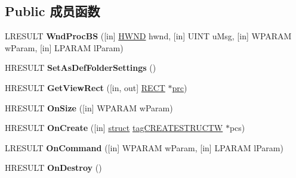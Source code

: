 \subsection*{Public 成员函数}
\begin{DoxyCompactItemize}
\item 
\mbox{\label{interface_i_browser_service2_a2fdc0084f4085173ca7bad99a1806fd5}} 
L\+R\+E\+S\+U\+LT {\bfseries Wnd\+Proc\+BS} (\mbox{[}in\mbox{]} \hyperlink{interfacevoid}{H\+W\+ND} hwnd, \mbox{[}in\mbox{]} U\+I\+NT u\+Msg, \mbox{[}in\mbox{]} W\+P\+A\+R\+AM w\+Param, \mbox{[}in\mbox{]} L\+P\+A\+R\+AM l\+Param)
\item 
\mbox{\label{interface_i_browser_service2_ae98d946de434359c07318739a6fcfe87}} 
H\+R\+E\+S\+U\+LT {\bfseries Set\+As\+Def\+Folder\+Settings} ()
\item 
\mbox{\label{interface_i_browser_service2_a718ad7c0e747f232bbd838df2f75132b}} 
H\+R\+E\+S\+U\+LT {\bfseries Get\+View\+Rect} (\mbox{[}in, out\mbox{]} \hyperlink{structtag_r_e_c_t}{R\+E\+CT} $\ast$\hyperlink{structtag_r_e_c_t}{prc})
\item 
\mbox{\label{interface_i_browser_service2_a6739bc3a64960028d34b783988ab1837}} 
H\+R\+E\+S\+U\+LT {\bfseries On\+Size} (\mbox{[}in\mbox{]} W\+P\+A\+R\+AM w\+Param)
\item 
\mbox{\label{interface_i_browser_service2_abacf693656f961c42b044a5ecba60022}} 
H\+R\+E\+S\+U\+LT {\bfseries On\+Create} (\mbox{[}in\mbox{]} \hyperlink{interfacestruct}{struct} \hyperlink{structtag_c_r_e_a_t_e_s_t_r_u_c_t_w}{tag\+C\+R\+E\+A\+T\+E\+S\+T\+R\+U\+C\+TW} $\ast$pcs)
\item 
\mbox{\label{interface_i_browser_service2_adbdfbe866c02899fb3917ddde001eb20}} 
L\+R\+E\+S\+U\+LT {\bfseries On\+Command} (\mbox{[}in\mbox{]} W\+P\+A\+R\+AM w\+Param, \mbox{[}in\mbox{]} L\+P\+A\+R\+AM l\+Param)
\item 
\mbox{\label{interface_i_browser_service2_a0ad052d78b39320c12213d39d5dad36a}} 
H\+R\+E\+S\+U\+LT {\bfseries On\+Destroy} ()
\item 

\end{DoxyCompactItemize}
